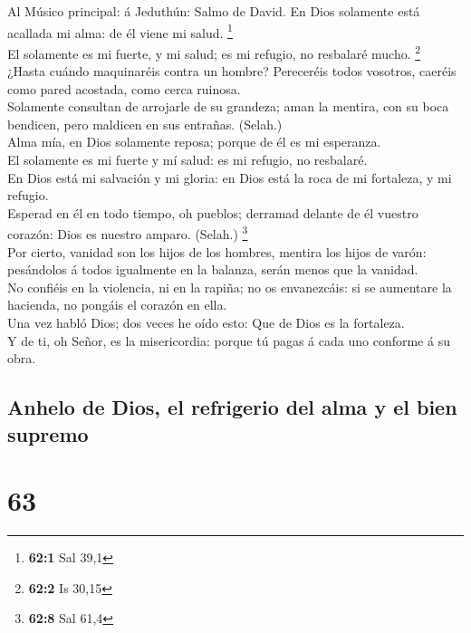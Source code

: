  Al Músico principal: á Jeduthún: Salmo de David. En Dios
solamente está acallada mi alma: de él viene mi salud. \footnote{\textbf{62:1}
  Sal 39,1}\\
 El solamente es mi fuerte, y mi salud; es mi refugio, no
resbalaré mucho. \footnote{\textbf{62:2} Is 30,15}\\
 ¿Hasta cuándo maquinaréis contra un hombre? Pereceréis
todos vosotros, caeréis como pared acostada, como cerca ruinosa.\\
 Solamente consultan de arrojarle de su grandeza; aman la
mentira, con su boca bendicen, pero maldicen en sus entrañas. (Selah.)\\
 Alma mía, en Dios solamente reposa; porque de él es mi
esperanza.\\
 El solamente es mi fuerte y mí salud: es mi refugio, no
resbalaré.\\
 En Dios está mi salvación y mi gloria: en Dios está la
roca de mi fortaleza, y mi refugio.\\
 Esperad en él en todo tiempo, oh pueblos; derramad
delante de él vuestro corazón: Dios es nuestro amparo. (Selah.)
\footnote{\textbf{62:8} Sal 61,4}\\
 Por cierto, vanidad son los hijos de los hombres, mentira
los hijos de varón: pesándolos á todos igualmente en la balanza, serán
menos que la vanidad.\\
 No confiéis en la violencia, ni en la rapiña; no os
envanezcáis: si se aumentare la hacienda, no pongáis el corazón en
ella.\\
 Una vez habló Dios; dos veces he oído esto: Que de Dios
es la fortaleza.\\
 Y de ti, oh Señor, es la misericordia: porque tú pagas á
cada uno conforme á su obra.

\hypertarget{anhelo-de-dios-el-refrigerio-del-alma-y-el-bien-supremo}{%
\subsection{Anhelo de Dios, el refrigerio del alma y el bien
supremo}\label{anhelo-de-dios-el-refrigerio-del-alma-y-el-bien-supremo}}

\hypertarget{section-62}{%
\section{63}\label{section-62}}

